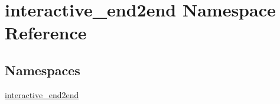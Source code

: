 \hypertarget{namespaceinteractive__end2end}{}\section{interactive\+\_\+end2end Namespace Reference}
\label{namespaceinteractive__end2end}
\subsection*{Namespaces}
\begin{DoxyCompactItemize}
\item 
 \hyperlink{namespaceinteractive__end2end_1_1interactive__end2end}{interactive\+\_\+end2end}
\end{DoxyCompactItemize}
